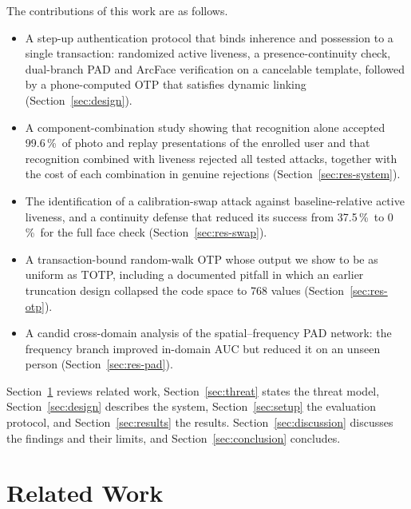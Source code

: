 \documentclass{ieeeaccess}
\newcommand{\pct}{\,\%}
\begin{document}
The contributions of this work are as follows.
\begin{itemize}
\item A step-up authentication protocol that binds inherence and possession to a single transaction:
randomized active liveness, a presence-continuity check, dual-branch PAD and ArcFace verification on a
cancelable template, followed by a phone-computed OTP that satisfies dynamic linking
(Section~\ref{sec:design}).
\item A component-combination study showing that recognition alone accepted 99.6\pct\ of photo and
replay presentations of the enrolled user and that recognition combined with liveness rejected all
tested attacks, together with the cost of each combination in genuine rejections
(Section~\ref{sec:res-system}).
\item The identification of a calibration-swap attack against baseline-relative active liveness, and a
continuity defense that reduced its success from 37.5\pct\ to 0\pct\ for the full face check
(Section~\ref{sec:res-swap}).
\item A transaction-bound random-walk OTP whose output we show to be as uniform as TOTP, including a
documented pitfall in which an earlier truncation design collapsed the code space to 768 values
(Section~\ref{sec:res-otp}).
\item A candid cross-domain analysis of the spatial--frequency PAD network: the frequency branch
improved in-domain AUC but reduced it on an unseen person (Section~\ref{sec:res-pad}).
\end{itemize}

Section~\ref{sec:related} reviews related work, Section~\ref{sec:threat} states the threat model,
Section~\ref{sec:design} describes the system, Section~\ref{sec:setup} the evaluation protocol, and
Section~\ref{sec:results} the results. Section~\ref{sec:discussion} discusses the findings and their
limits, and Section~\ref{sec:conclusion} concludes.

\section{Related Work}
\label{sec:related}
\end{document}
